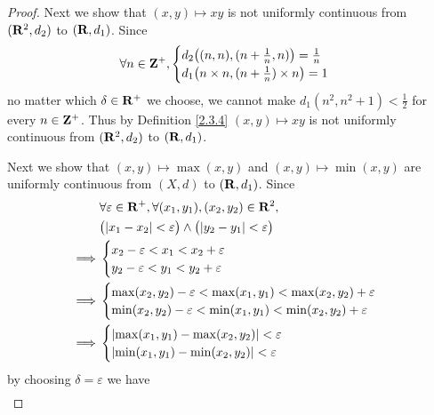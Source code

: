 \begin{proof}
    Next we show that \((x, y) \mapsto xy\) is not uniformly continuous from \((\mathbf{R}^2, d_2)\) to \((\mathbf{R}, d_1)\).
    Since
    \[
        \forall n \in \mathbf{Z}^+, \begin{cases}
            d_2\big((n, n), (n + \frac{1}{n}, n)\big) = \frac{1}{n} \\
            d_1\big(n \times n, (n + \frac{1}{n}) \times n\big) = 1
        \end{cases}
    \]
    no matter which \(\delta \in \mathbf{R}^+\) we choose, we cannot make \(d_1(n^2, n^2 + 1) < \frac{1}{2}\) for every \(n \in \mathbf{Z}^+\).
    Thus by Definition \ref{2.3.4} \((x, y) \mapsto xy\) is not uniformly continuous from \((\mathbf{R}^2, d_2)\) to \((\mathbf{R}, d_1)\).

    Next we show that \((x, y) \mapsto \max(x, y)\) and \((x, y) \mapsto \min(x, y)\) are uniformly continuous from \((X, d)\) to \((\mathbf{R}, d_1)\).
    Since
    \begin{align*}
                 & \forall \varepsilon \in \R^+, \forall (x_1, y_1), (x_2, y_2) \in \R^2,                \\
                 & \big(\abs{x_1 - x_2} < \varepsilon\big) \land \big(\abs{y_2 - y_1} < \varepsilon\big) \\
        \implies & \begin{cases}
                       x_2 - \varepsilon < x_1 < x_2 + \varepsilon \\
                       y_2 - \varepsilon < y_1 < y_2 + \varepsilon \\
                   \end{cases}                                           \\
        \implies & \begin{cases}
                       \max(x_2, y_2) - \varepsilon < \max(x_1, y_1) < \max(x_2, y_2) + \varepsilon \\
                       \min(x_2, y_2) - \varepsilon < \min(x_1, y_1) < \min(x_2, y_2) + \varepsilon
                   \end{cases}          \\
        \implies & \begin{cases}
                       \abs{\max(x_1, y_1) - \max(x_2, y_2)} < \varepsilon \\
                       \abs{\min(x_1, y_1) - \min(x_2, y_2)} < \varepsilon
                   \end{cases}
    \end{align*}
    by choosing \(\delta = \varepsilon\) we have
    \begin{align*}

\end{align*}
\end{proof}
